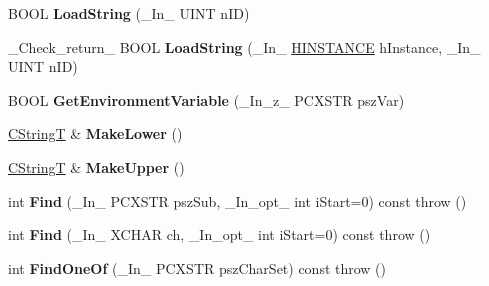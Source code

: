 \begin{DoxyCompactItemize}
\item 
\mbox{\label{class_a_t_l_1_1_c_string_t_a4414860f39fd0caed7154b642fef82e5}} 
B\+O\+OL {\bfseries Load\+String} (\+\_\+\+In\+\_\+ U\+I\+NT n\+ID)
\item 
\mbox{\label{class_a_t_l_1_1_c_string_t_a18d059721bc40c7dfe09a31695518a8a}} 
\+\_\+\+Check\+\_\+return\+\_\+ B\+O\+OL {\bfseries Load\+String} (\+\_\+\+In\+\_\+ \hyperlink{interfacevoid}{H\+I\+N\+S\+T\+A\+N\+CE} h\+Instance, \+\_\+\+In\+\_\+ U\+I\+NT n\+ID)
\item 
\mbox{\label{class_a_t_l_1_1_c_string_t_a0d01860a3ceb6e4bf7f0e69f6508b66a}} 
B\+O\+OL {\bfseries Get\+Environment\+Variable} (\+\_\+\+In\+\_\+z\+\_\+ P\+C\+X\+S\+TR psz\+Var)
\item 
\mbox{\label{class_a_t_l_1_1_c_string_t_a5f9ea1df2f2e0c08eb2d8e90d9ed45f6}} 
\hyperlink{class_a_t_l_1_1_c_string_t}{C\+StringT} \& {\bfseries Make\+Lower} ()
\item 
\mbox{\label{class_a_t_l_1_1_c_string_t_a35c601013e453957c9c8c1aba87d8531}} 
\hyperlink{class_a_t_l_1_1_c_string_t}{C\+StringT} \& {\bfseries Make\+Upper} ()
\item 
\mbox{\label{class_a_t_l_1_1_c_string_t_afb6cd04aced2d118499a49d5d924d819}} 
int {\bfseries Find} (\+\_\+\+In\+\_\+ P\+C\+X\+S\+TR psz\+Sub, \+\_\+\+In\+\_\+opt\+\_\+ int i\+Start=0) const  throw ()
\item 
\mbox{\label{class_a_t_l_1_1_c_string_t_a526734a3e01939958fd98235883b68f5}} 
int {\bfseries Find} (\+\_\+\+In\+\_\+ X\+C\+H\+AR ch, \+\_\+\+In\+\_\+opt\+\_\+ int i\+Start=0) const  throw ()
\item 
\mbox{\label{class_a_t_l_1_1_c_string_t_a38427201f440622a8915b2a29c452336}} 
int {\bfseries Find\+One\+Of} (\+\_\+\+In\+\_\+ P\+C\+X\+S\+TR psz\+Char\+Set) const  throw ()
\item 
\mbox{\label{class_a_t_l_1_1_c_string_t_af969113aa450b9f326b038d37877d84a}} 

\end{DoxyCompactItemize}
